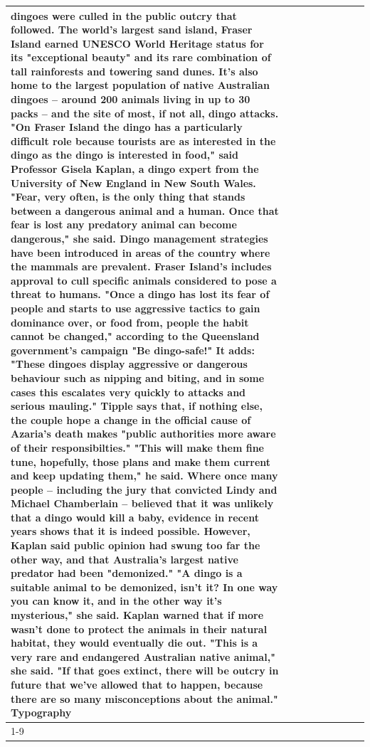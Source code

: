 \begin{table}[H]
\begin{tabular}{lllrlllll}
dingoes were culled in the public outcry that followed. The world's largest sand island, Fraser Island earned UNESCO World Heritage status for its "exceptional beauty" and its rare combination of tall rainforests and towering sand dunes. It's also home to the largest population of native Australian dingoes -- around 200 animals living in up to 30 packs -- and the site of most, if not all, dingo attacks. "On Fraser Island the dingo has a particularly difficult role because tourists are as interested in the dingo as the dingo is interested in food," said Professor Gisela Kaplan, a dingo expert from the University of New England in New South Wales. "Fear, very often, is the only thing that stands between a dangerous animal and a human. Once that fear is lost any predatory animal can become dangerous," she said. Dingo management strategies have been introduced in areas of the country where the mammals are prevalent. Fraser Island's includes approval to cull specific animals considered to pose a threat to humans. "Once a dingo has lost its fear of people and starts to use aggressive tactics to gain dominance over, or food from, people the habit cannot be changed," according to the Queensland government's campaign "Be dingo-safe!" It adds: "These dingoes display aggressive or dangerous behaviour such as nipping and biting, and in some cases this escalates very quickly to attacks and serious mauling." Tipple says that, if nothing else, the couple hope a change in the official cause of Azaria's death makes "public authorities more aware of their responsibilties." "This will make them fine tune, hopefully, those plans and make them current and keep updating them," he said. Where once many people -- including the jury that convicted Lindy and Michael Chamberlain -- believed that it was unlikely that a dingo would kill a baby, evidence in recent years shows that it is indeed possible. However, Kaplan said public opinion had swung too far the other way, and that Australia's largest native predator had been "demonized." "A dingo is a suitable animal to be demonized, isn't it? In one way you can know it, and in the other way it's mysterious," she said. Kaplan warned that if more wasn't done to protect the animals in their natural habitat, they would eventually die out. "This is a very rare and endangered Australian native animal," she said. "If that goes extinct, there will be outcry in future that we've allowed that to happen, because there are so many misconceptions about the animal." Typography \\
\cline{1-9}

\end{tabular}
\end{table}
